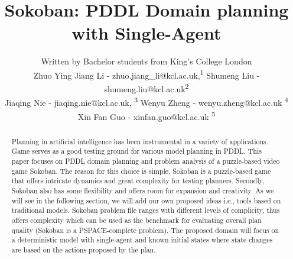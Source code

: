 \documentclass[letterpaper]{article} %
\title{Sokoban: PDDL Domain planning with Single-Agent}
\author{Written by Bachelor students from King's College London \\  %
Zhuo Ying Jiang Li - zhuo.jiang\_li@kcl.ac.uk,\textsuperscript{\rm 1}
Shumeng Liu - shumeng.liu@kcl.ac.uk\textsuperscript{\rm 2} \\
Jiaqing Nie - jiaqing.nie@kcl.ac.uk, \textsuperscript{\rm 3}
Wenyu Zheng - wenyu.zheng@kcl.ac.uk \textsuperscript{\rm 4} \\
Xin Fan Guo - xinfan.guo@kcl.ac.uk \textsuperscript{\rm 5} \\ %
}
\begin{document}
\maketitle

\begin{abstract}
Planning in artificial intelligence has been instrumental in a variety of applications. Game serves as a good testing ground for various model planning in PDDL. This paper focuses on PDDL  domain planning and problem analysis of a puzzle-based video game Sokoban.  The reason for this choice is simple, Sokoban is a puzzle-based game that offers intricate dynamics and great complexity for testing planners. Secondly, Sokoban also has some flexibility and offers room for expansion and creativity. As we will see in the following section, we will add our own proposed ideas i.e., tools based on traditional models.  Sokoban problem file ranges with different levels of complicity, thus offers complexity which can be used as the benchmark for evaluating overall plan quality (Sokoban is  a PSPACE-complete problem). The proposed domain will focus on a deterministic model with single-agent and known initial states where state changes are based on the actions proposed by the plan.
\end{abstract}
\end{document}
